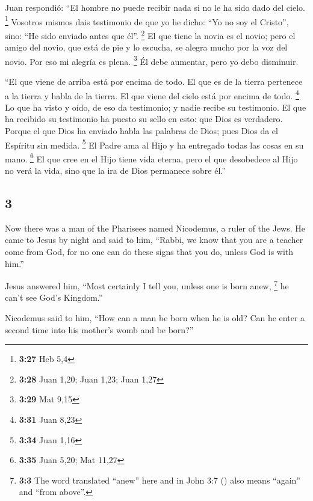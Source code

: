 \begin{paracol}{2}
 Juan respondió: ``El hombre no puede recibir nada si no
le ha sido dado del cielo. \footnote{\textbf{3:27} Heb 5,4}
 Vosotros mismos dais testimonio de que yo he dicho: ``Yo
no soy el Cristo'', sino: ``He sido enviado antes que él''. \footnote{\textbf{3:28}
  Juan 1,20; Juan 1,23; Juan 1,27}  El que tiene la novia
es el novio; pero el amigo del novio, que está de pie y lo escucha, se
alegra mucho por la voz del novio. Por eso mi alegría es plena.
\footnote{\textbf{3:29} Mat 9,15}  Él debe aumentar, pero
yo debo disminuir.

 ``El que viene de arriba está por encima de todo. El que
es de la tierra pertenece a la tierra y habla de la tierra. El que viene
del cielo está por encima de todo. \footnote{\textbf{3:31} Juan 8,23}
 Lo que ha visto y oído, de eso da testimonio; y nadie
recibe su testimonio.  El que ha recibido su testimonio
ha puesto su sello en esto: que Dios es verdadero. 
Porque el que Dios ha enviado habla las palabras de Dios; pues Dios da
el Espíritu sin medida. \footnote{\textbf{3:34} Juan 1,16}
 El Padre ama al Hijo y ha entregado todas las cosas en
su mano. \footnote{\textbf{3:35} Juan 5,20; Mat 11,27} 
El que cree en el Hijo tiene vida eterna, pero el que desobedece al Hijo
no verá la vida, sino que la ira de Dios permanece sobre él.''

\switchcolumn
\begin{otherlanguage}{english}

\hypertarget{section-5}{%
\section{3}\label{section-5}}

 Now there was a man of the Pharisees named Nicodemus, a
ruler of the Jews.  He came to Jesus by night and said to
him, ``Rabbi, we know that you are a teacher come from God, for no one
can do these signs that you do, unless God is with him.''

 Jesus answered him, ``Most certainly I tell you, unless
one is born anew, \footnote{\textbf{3:3} The word translated ``anew''
  here and in John 3:7 () also means ``again'' and ``from
  above''.} he can't see God's Kingdom.''

 Nicodemus said to him, ``How can a man be born when he is
old? Can he enter a second time into his mother's womb and be born?''


\end{otherlanguage}
\end{paracol}
